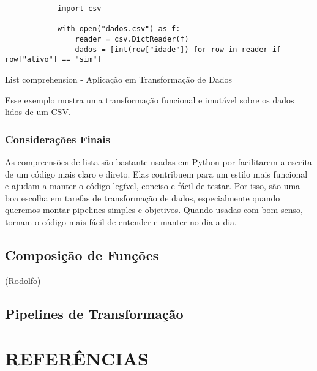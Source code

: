 \documentclass[date,twocolumn,a4paper]{ppgem}
\begin{document}
    \begin{listing}[!ht]
        \begin{verbatim}
            import csv

            with open("dados.csv") as f:
                reader = csv.DictReader(f)
                dados = [int(row["idade"]) for row in reader if row["ativo"] == "sim"]
        \end{verbatim}
        \caption{List comprehension - Aplicação em Transformação de Dados}
        \label{listing:2}
    \end{listing}

    Esse exemplo mostra uma transformação funcional e imutável sobre os dados lidos de um CSV.

    \subsubsection{Considerações Finais}
    As compreensões de lista são bastante usadas em Python por facilitarem a escrita de um código mais claro e direto. Elas contribuem para um estilo mais funcional e ajudam a manter o código legível, conciso e fácil de testar. Por isso, são uma boa escolha em tarefas de transformação de dados, especialmente quando queremos montar pipelines simples e objetivos. Quando usadas com bom senso, tornam o código mais fácil de entender e manter no dia a dia.

    
    
    \subsection{Composição de Funções}
    (Rodolfo)
    \subsection{Pipelines de Transformação}

    \section{REFERÊNCIAS}\\
    
\end{document}
